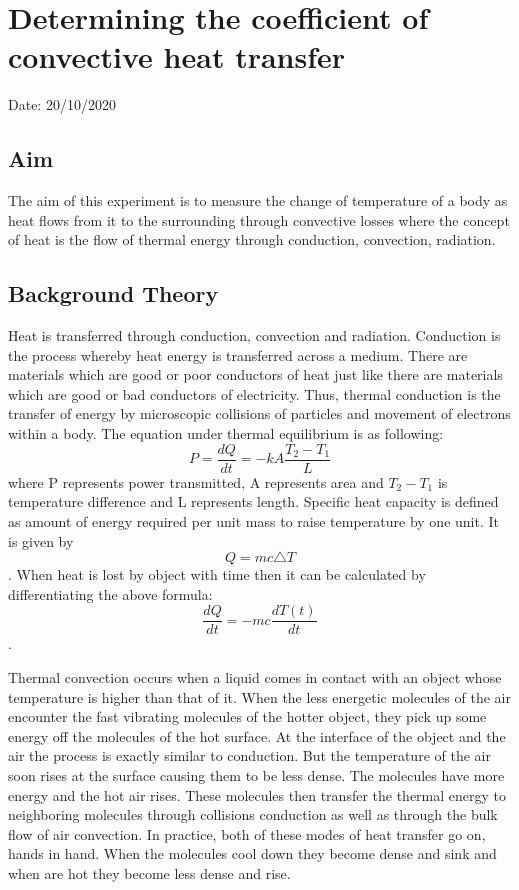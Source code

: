 \chapter{Determining the coefficient of convective heat transfer}

Date: 20/10/2020

\section{Aim}
The aim of this experiment is to measure the change of temperature of a body as heat flows from it to the surrounding through convective losses where the concept of heat is the flow of thermal energy through conduction, convection, radiation.


\section{Background Theory}
Heat is transferred through conduction, convection and radiation. Conduction is the process whereby heat energy is transferred across a medium. There are materials which are good or poor conductors of heat just like there are materials which are good or bad conductors of electricity. Thus, thermal conduction is the transfer of energy by microscopic collisions of particles and movement of electrons within a body. The equation under thermal equilibrium is as following: 
$$P= \frac{dQ}{dt} = -kA \frac{T_2 - T_1}{L} $$ where P represents power transmitted, A represents area and $T_2 - T_1$ is temperature difference and L represents length. 
Specific heat capacity is defined as amount of energy required per unit mass to raise temperature by one unit. It is given by $$Q=mc \triangle T $$. When heat is lost by object with time then it can be calculated by differentiating the above formula: 
$$\frac{dQ}{dt} = -mc \frac{dT(t)}{dt} $$.

Thermal convection occurs when a liquid comes in contact with an object whose temperature is higher than that of it. When the less energetic molecules of the air encounter the fast vibrating molecules of the hotter object, they pick up some energy off the molecules of the hot surface. At the interface of the object and the air the process is exactly similar to conduction. But the temperature of the air soon rises at the surface causing them to be less dense. The molecules have more energy and the hot air rises. These molecules then transfer the thermal energy to neighboring molecules through collisions conduction as well as through the bulk flow of air convection. In practice, both of these modes of heat transfer go on, hands in hand. When the molecules cool down they become dense and sink and when are hot they become less dense and rise. 

